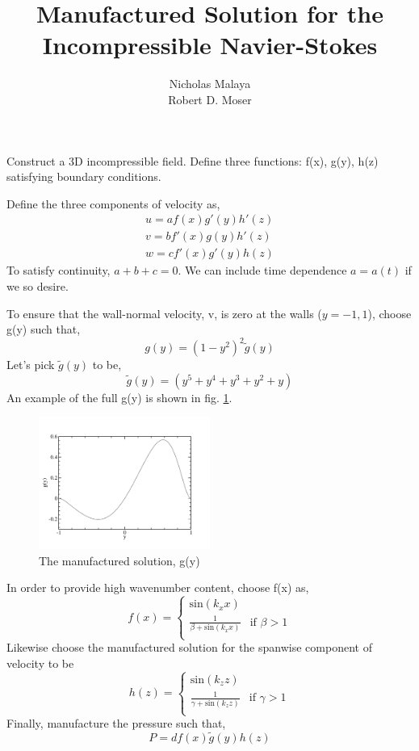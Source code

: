 \documentclass{article}
\title{\bf{Manufactured Solution for the Incompressible Navier-Stokes}}
\author{Nicholas Malaya \\ Robert D. Moser} \date{}
\begin{document}
\maketitle

Construct a 3D incompressible field. Define three functions: f(x), g(y),
h(z) satisfying boundary conditions. 

Define the three components of velocity as,
\begin{align}
u = a f(x)  g'(y)  h'(z) \\
v = b f'(x) g(y)   h'(z) \\
w = c f'(x) g'(y)  h(z) 
\end{align}
To satisfy continuity, $a+b+c=0$. We can include time dependence
$a=a(t)$ if we so desire.

To ensure that the wall-normal velocity, v, is  zero at the walls ($y=-1,1$), choose
g(y) such that, 
\begin{equation}
 g(y) = (1-y^2)^2 \tilde g(y)
\end{equation}
Let's pick $\tilde g(y)$ to be,
\begin{equation}
\tilde g(y) = (y^5 + y^4 + y^3 + y^2 + y)
\end{equation}
An example of the full g(y) is shown in fig. \ref{gy}.

\begin{figure}
 \centering
 \includegraphics[width=0.5\textwidth]{gtilde.pdf}
 \caption{The manufactured solution, g(y)}
 \label{gy}
\end{figure}


In order to provide high wavenumber content, choose f(x) as,
\begin{equation}
 f(x) =
  \begin{cases}
   \text{sin}(k_x x)  \\
   \frac{1}{\beta + \text{sin}(k_x x)} & \mbox{if } \beta > 1 \\
  \end{cases}
\end{equation}
Likewise choose the manufactured solution for the spanwise component of
velocity to be
\begin{equation}
 h(z) =
  \begin{cases}
   \text{sin}(k_z z)  \\
   \frac{1}{\gamma + \text{sin}(k_z z)} & \mbox{if } \gamma > 1 \\
  \end{cases}
\end{equation}
Finally, manufacture the pressure such that, 
\begin{equation}
 P = d f(x) \tilde g(y) h(z)
\end{equation}
\end{document}
